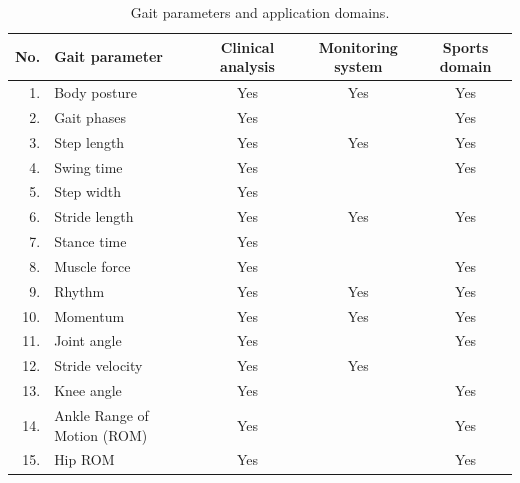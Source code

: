 \begin{table}[!htbp]
\centering\small
\caption{Gait parameters and application domains.}
\label{gaitapps}
\renewcommand{\arraystretch}{1.07}
\begin{tabularx}{0.94\linewidth}{@{}r >{\raggedright\arraybackslash}X c c c@{}}
\toprule
\textbf{No.} & \textbf{Gait parameter} & \textbf{Clinical analysis} & \textbf{Monitoring system} & \textbf{Sports domain}\\
\midrule
1.  & Body posture & Yes & Yes & Yes \\
2.  & Gait phases & Yes &  & Yes \\
3.  & Step length & Yes & Yes & Yes \\
4.  & Swing time & Yes &  & Yes \\
5.  & Step width & Yes &  &  \\
6.  & Stride length & Yes & Yes & Yes \\
7.  & Stance time & Yes &  &  \\
8.  & Muscle force & Yes &  & Yes \\
9.  & Rhythm & Yes & Yes & Yes \\
10. & Momentum & Yes & Yes & Yes \\
11. & Joint angle & Yes &  & Yes \\
12. & Stride velocity & Yes & Yes &  \\
13. & Knee angle & Yes &  & Yes \\
14. & Ankle Range of Motion (ROM) & Yes &  & Yes \\
15. & Hip ROM & Yes &  & Yes \\
\bottomrule
\end{tabularx}
\end{table}
